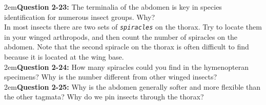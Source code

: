 \documentclass[letterpaper, 11pt]{article}
\newcommand{\latinword}[1]{\texttt{\itshape #1}}%
\begin{document}
\hangindent2em\textbf{Question 2-23:} The terminalia of the abdomen is key in species identification for numerous insect groups. Why? \\

\noindent{}In most insects there are two sets of \latinword{spiracles} on the thorax. Try to locate them in your winged arthropods, and then count the number of spiracles on the abdomen. Note that the second spiracle on the thorax is often difficult to find because it is located at the wing base. \\

\hangindent2em\textbf{Question 2-24:} How many spiracles could you find in the hymenopteran specimens? Why is the number different from other winged insects?\\

\hangindent2em\textbf{Question 2-25:} Why is the abdomen generally softer and more flexible than the other tagmata? Why do we pin insects through the thorax?



\end{document}
